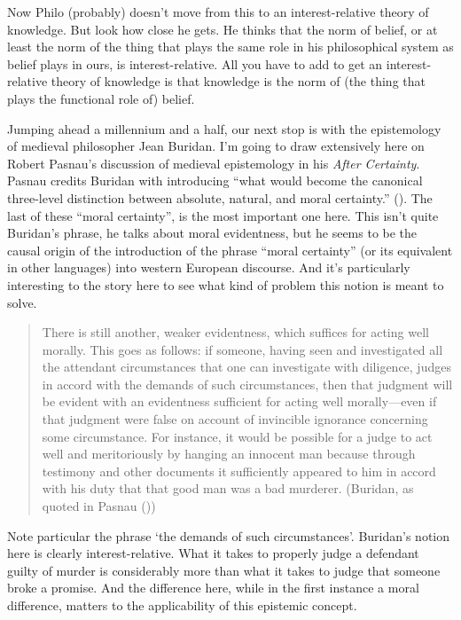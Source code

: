 \documentclass[
  12pt,
  letterpaper,
]{scrbook}
\begin{document}
Now Philo (probably) doesn't move from this to an interest-relative
theory of knowledge. But look how close he gets. He thinks that the norm
of belief, or at least the norm of the thing that plays the same role in
his philosophical system as belief plays in ours, is interest-relative.
All you have to add to get an interest-relative theory of knowledge is
that knowledge is the norm of (the thing that plays the functional role
of) belief.

Jumping ahead a millennium and a half, our next stop is with the
epistemology of medieval philosopher Jean Buridan. I'm going to draw
extensively here on Robert Pasnau's discussion of medieval epistemology
in his \emph{After Certainty}. Pasnau credits Buridan with introducing
``what would become the canonical three-level distinction between
absolute, natural, and moral certainty.''
(). The last of these ``moral
certainty'', is the most important one here. This isn't quite Buridan's
phrase, he talks about moral evidentness, but he seems to be the causal
origin of the introduction of the phrase ``moral certainty'' (or its
equivalent in other languages) into western European discourse. And it's
particularly interesting to the story here to see what kind of problem
this notion is meant to solve.

\begin{quote}
There is still another, weaker evidentness, which suffices for acting
well morally. This goes as follows: if someone, having seen and
investigated all the attendant circumstances that one can investigate
with diligence, judges in accord with the demands of such circumstances,
then that judgment will be evident with an evidentness sufficient for
acting well morally---even if that judgment were false on account of
invincible ignorance concerning some circumstance. For instance, it
would be possible for a judge to act well and meritoriously by hanging
an innocent man because through testimony and other documents it
sufficiently appeared to him in accord with his duty that that good man
was a bad murderer. (Buridan, as quoted in Pasnau
())
\end{quote}

Note particular the phrase `the demands of such circumstances'.
Buridan's notion here is clearly interest-relative. What it takes to
properly judge a defendant guilty of murder is considerably more than
what it takes to judge that someone broke a promise. And the difference
here, while in the first instance a moral difference, matters to the
applicability of this epistemic concept.
\end{document}
